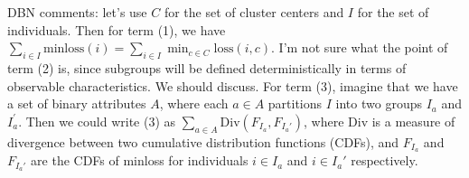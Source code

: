 \documentclass{article}
\begin{document}
\noindent DBN comments: let's use $C$ for the set of cluster centers and $I$ for the set of individuals.  Then for term (1), we have $\sum_{i \in I} \mbox{minloss}(i) = \sum_{i \in I} \min_{c \in C} \mbox{loss}(i,c)$.  I'm not sure what the point of term (2) is, since subgroups will be defined deterministically in terms of observable characteristics.  We should discuss.  For term (3), imagine that we have a set of binary attributes $A$, where each $a\in A$ partitions $I$ into two groups $I_a$ and $I_a^\prime$. Then we could write (3) as $\sum_{a \in A} \mbox{Div}(F_{I_a},F_{I_a'})$, where $\mbox{Div}$ is a measure of divergence between two cumulative distribution functions (CDFs), and $F_{I_a}$ and $F_{I_a'}$ are the CDFs of \mbox{minloss} for individuals $i \in I_a$ and $i \in I_a'$ respectively.\\



\end{document}

